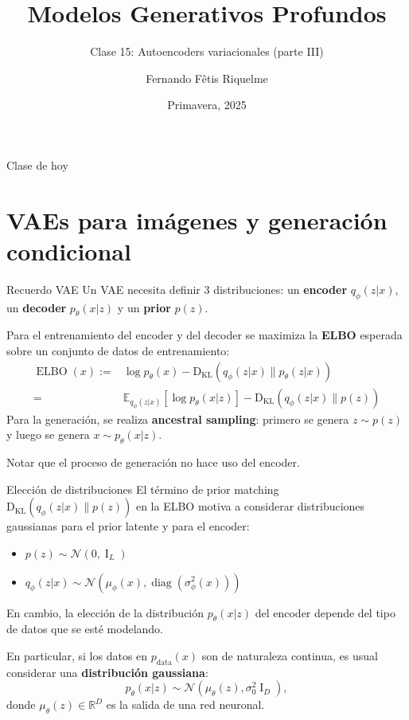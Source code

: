 \documentclass{beamer}
\title{Modelos Generativos Profundos}
\subtitle{Clase 15: Autoencoders variacionales (parte III)}
\author{Fernando Fêtis Riquelme}
\institute{
    Facultad de Ciencias Físicas y Matemáticas\\
    Universidad de Chile
}
\date{Primavera, 2025}
\newcommand{\R}{\mathbb{R}}
\begin{document}
\begin{frame}
    \titlepage
\end{frame}

\begin{frame}{Clase de hoy}
    \tableofcontents
\end{frame}

\section{VAEs para imágenes y generación condicional}

\begin{frame}{Recuerdo VAE}
    Un VAE necesita definir 3 distribuciones: un \textbf{encoder} $q_\phi(z|x)$, un \textbf{decoder} $p_\theta(x|z)$ y un \textbf{prior} $p(z)$.

    Para el entrenamiento del encoder y del decoder se maximiza la \textbf{ELBO} esperada sobre un conjunto de datos de entrenamiento:
    \begin{align*}
        \operatorname{ELBO}(x):= & \log p_\theta(x)-\operatorname{{D}_{KL}}\left(q_\phi(z|x)\| p_\theta(z|x)\right)                                 \\
        =                        & \mathbb{E}_{q_\phi(z|x)}\left[\log p_\theta(x|z)\right] - \operatorname{{D}_{KL}}\left(q_\phi(z|x)\| p(z)\right)
    \end{align*}
    Para la generación, se realiza \textbf{ancestral sampling}: primero se genera $z\sim p(z)$ y luego se genera $x\sim p_\theta(x|z)$.

    Notar que el proceso de generación no hace uso del encoder.
\end{frame}

\begin{frame}{Elección de distribuciones}
    El término de prior matching $\operatorname{{D}_{KL}}\left(q_\phi(z|x)\| p(z)\right)$ en la ELBO motiva a considerar distribuciones gaussianas para el prior latente y para el encoder:
    \begin{itemize}
        \item $p(z) \sim \mathcal{N}( 0, \operatorname{I}_L)$
        \item $q_\phi(z|x) \sim \mathcal{N}(\mu_\phi(x), \operatorname{diag}(\sigma^2_\phi(x)))$
    \end{itemize}
    En cambio, la elección de la distribución $p_\theta(x|z)$ del encoder depende del tipo de datos que se esté modelando.

    En particular, si los datos en $p_\text{data}(x)$ son de naturaleza continua, es usual considerar una \textbf{distribución gaussiana}:
    \begin{equation*}
        p_\theta(x|z) \sim \mathcal{N}(\mu_\theta(z), \sigma^2_0\operatorname{I}_D),
    \end{equation*}
    donde $\mu_\theta(z)\in\R^D$ es la salida de una red neuronal.
\end{frame}
\end{document}
